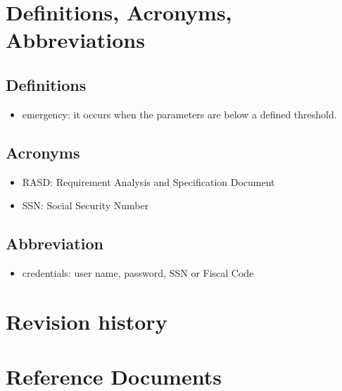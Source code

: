 \section{Definitions, Acronyms, Abbreviations}
\subsection{Definitions}
\begin{itemize}
    \item emergency: it occurs when the parameters are below a defined threshold. 
\end{itemize}

\subsection{Acronyms}
\begin{itemize}
    \item RASD: Requirement Analysis and Specification Document 
    \item SSN: Social Security Number
\end{itemize}
\subsection{Abbreviation}
\begin{itemize}
    \item credentials: user name, password, SSN or Fiscal Code
\end{itemize}
\section{Revision history}
\section{Reference Documents}


